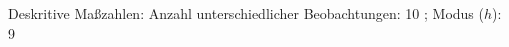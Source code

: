 				\label{tableValues:afec05o_g1r}
				\vspace*{-\baselineskip}
                    \begin{noten}
                	    \note{} Deskritive Maßzahlen:
                	    Anzahl unterschiedlicher Beobachtungen: 10%
                	    ; 
                	      Modus ($h$): 9
                     \end{noten}


